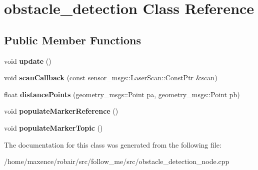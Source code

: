 \hypertarget{classobstacle__detection}{}\section{obstacle\+\_\+detection Class Reference}
\label{classobstacle__detection}
\subsection*{Public Member Functions}
\begin{DoxyCompactItemize}
\item 
void {\bfseries update} ()\hypertarget{classobstacle__detection_a08b76a0dee4d87611148d69ae1e545bb}{}\label{classobstacle__detection_a08b76a0dee4d87611148d69ae1e545bb}

\item 
void {\bfseries scan\+Callback} (const sensor\+\_\+msgs\+::\+Laser\+Scan\+::\+Const\+Ptr \&scan)\hypertarget{classobstacle__detection_ae5c75b08a79d77bc56ed8c587957f3c1}{}\label{classobstacle__detection_ae5c75b08a79d77bc56ed8c587957f3c1}

\item 
float {\bfseries distance\+Points} (geometry\+\_\+msgs\+::\+Point pa, geometry\+\_\+msgs\+::\+Point pb)\hypertarget{classobstacle__detection_a3d415f62f28819234c3a647468e00cbf}{}\label{classobstacle__detection_a3d415f62f28819234c3a647468e00cbf}

\item 
void {\bfseries populate\+Marker\+Reference} ()\hypertarget{classobstacle__detection_adbd60ebde5fee0bef5c89ade283c9014}{}\label{classobstacle__detection_adbd60ebde5fee0bef5c89ade283c9014}

\item 
void {\bfseries populate\+Marker\+Topic} ()\hypertarget{classobstacle__detection_a51e965f9be4ddd8f7b991359ee167960}{}\label{classobstacle__detection_a51e965f9be4ddd8f7b991359ee167960}

\end{DoxyCompactItemize}


The documentation for this class was generated from the following file\+:\begin{DoxyCompactItemize}
\item 
/home/maxence/robair/src/follow\+\_\+me/src/obstacle\+\_\+detection\+\_\+node.\+cpp\end{DoxyCompactItemize}
